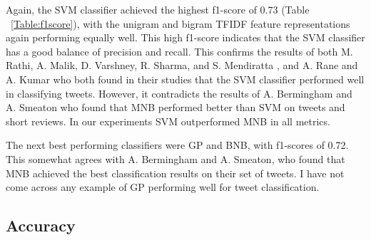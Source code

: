 Again, the SVM classifier achieved the highest f1-score of 0.73 (Table ~\ref{Table:f1score}), with the unigram and bigram TFIDF feature representations again performing equally well. This high f1-score indicates that the SVM classifier has a good balance of precision and recall. This confirms the results of both M. Rathi, A. Malik, D. Varshney, R. Sharma, and S. Mendiratta \cite{Raithi2018}, and A. Rane and A. Kumar \cite{Rane2018} who both found in their studies that the SVM classifier performed well in classifying tweets. However, it contradicts the results of A. Bermingham and A. Smeaton who found that MNB performed better than SVM on tweets and short reviews. In our experiments SVM outperformed MNB in all metrics.

The next best performing classifiers were GP and BNB, with f1-scores of 0.72. This somewhat agrees with A. Bermingham and A. Smeaton, who found that MNB achieved the best classification results on their set of tweets. I have not come across any example of GP performing well for tweet classification.

\subsection*{Accuracy}

